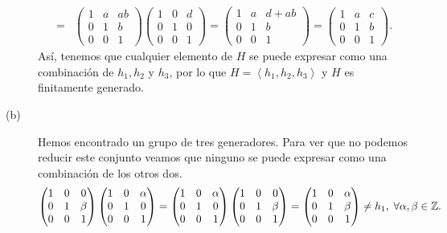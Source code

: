 \documentclass{article}
\begin{document}
\begin{sol}
\begin{description}
\[\begin{split}
	= & \begin{pmatrix} 1 & a & ab \\ 0 & 1 & b \\ 0 & 0 & 1 \end{pmatrix}\begin{pmatrix} 1 & 0 & d \\ 0 & 1 & 0 \\ 0 & 0 & 1 \end{pmatrix} = \begin{pmatrix} 1 & a & d+ab \\ 0 & 1 & b \\ 0 & 0 & 1 \end{pmatrix} = \begin{pmatrix} 1 & a & c \\ 0 & 1 & b \\ 0 & 0 & 1 \end{pmatrix} .
\end{split}
\]
Así, tenemos que cualquier elemento de $\displaystyle H $ se puede expresar como una combinación de $\displaystyle h_{1},h_{2} $ y $\displaystyle h_{3} $, por lo que $\displaystyle H = \left\langle h_{1}, h_{2}, h_{3} \right\rangle  $ y $\displaystyle H $ es finitamente generado.
\item[(b)] Hemos encontrado un grupo de tres generadores. Para ver que no podemos reducir este conjunto veamos que ninguno se puede expresar como una combinación de los otros dos. 
\[\begin{pmatrix} 1 & 0 & 0 \\ 0 & 1 & \beta \\ 0 & 0 & 1 \end{pmatrix}\begin{pmatrix} 1 & 0 & \alpha \\ 0 & 1 & 0 \\ 0 & 0 & 1 \end{pmatrix}=\begin{pmatrix} 1 & 0 & \alpha \\ 0 & 1 & 0 \\ 0 & 0 & 1 \end{pmatrix}\begin{pmatrix} 1 & 0 & 0 \\ 0 & 1 & \beta \\ 0 & 0 & 1 \end{pmatrix} =  \begin{pmatrix} 1 & 0 & \alpha \\ 0 & 1 & \beta \\ 0 & 0 & 1 \end{pmatrix} \neq h_{1}, \; \forall \alpha, \beta \in \mathbb{Z}.\]

\end{description}
\end{sol}
\end{document}

